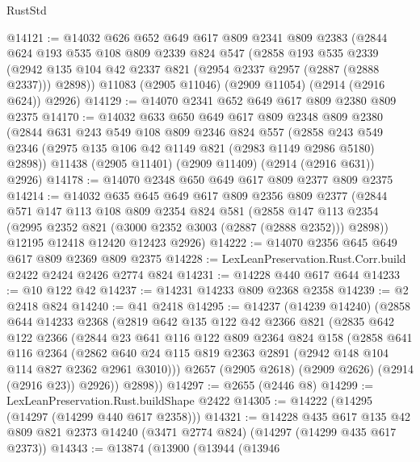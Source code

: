 \begin{lexlean}{RustStd}
\begin{coremodule}
@14121 := @14032
    @626
    @652
    @649
    @617
    @809
    @2341
    @809
    @2383
    (@2844
      @624
      @193
      @535
      @108
      @809
      @2339
      @824
      @547
      (@2858
        @193
        @535
        @2339
        (@2942 @135 @104 @42 @2337 @821 (@2954 @2337 @2957 (@2887 (@2888 @2337))) @2898))
      @11083
      (@2905 @11046)
      (@2909 @11054)
      (@2914 (@2916 @624))
      @2926)
@14129 := @14070 @2341 @652 @649 @617 @809 @2380 @809 @2375
@14170 := @14032
    @633
    @650
    @649
    @617
    @809
    @2348
    @809
    @2380
    (@2844
      @631
      @243
      @549
      @108
      @809
      @2346
      @824
      @557
      (@2858 @243 @549 @2346 (@2975 @135 @106 @42 @1149 @821 (@2983 @1149 @2986 @5180) @2898))
      @11438
      (@2905 @11401)
      (@2909 @11409)
      (@2914 (@2916 @631))
      @2926)
@14178 := @14070 @2348 @650 @649 @617 @809 @2377 @809 @2375
@14214 := @14032
    @635
    @645
    @649
    @617
    @809
    @2356
    @809
    @2377
    (@2844
      @571
      @147
      @113
      @108
      @809
      @2354
      @824
      @581
      (@2858 @147 @113 @2354 (@2995 @2352 @821 (@3000 @2352 @3003 (@2887 (@2888 @2352))) @2898))
      @12195
      @12418
      @12420
      @12423
      @2926)
@14222 := @14070 @2356 @645 @649 @617 @809 @2369 @809 @2375
@14228 := LexLeanPreservation.Rust.Corr.build @2422 @2424 @2426 @2774 @824
@14231 := @14228 @440 @617 @644
@14233 := @10 @122 @42
@14237 := @14231 @14233 @809 @2368 @2358
@14239 := @2 @2418 @824
@14240 := @41 @2418
@14295 := @14237
    (@14239 @14240)
    (@2858
      @644
      @14233
      @2368
      (@2819
        @642
        @135
        @122
        @42
        @2366
        @821
        (@2835
          @642
          @122
          @2366
          (@2844
            @23
            @641
            @116
            @122
            @809
            @2364
            @824
            @158
            (@2858
              @641
              @116
              @2364
              (@2862 @640 @24 @115 @819 @2363 @2891 (@2942 @148 @104 @114 @827 @2362 @2961 @3010)))
            @2657
            (@2905 @2618)
            (@2909 @2626)
            (@2914 (@2916 @23))
            @2926))
        @2898))
@14297 := @2655 (@2446 @8)
@14299 := LexLeanPreservation.Rust.buildShape @2422
@14305 := @14222 (@14295 (@14297 (@14299 @440 @617 @2358)))
@14321 := @14228
    @435
    @617
    @135
    @42
    @809
    @821
    @2373
    @14240
    (@3471 @2774 @824)
    (@14297 (@14299 @435 @617 @2373))
@14343 := @13874
    (@13900
      (@13944
        (@13946

\end{coremodule}
\end{lexlean}
